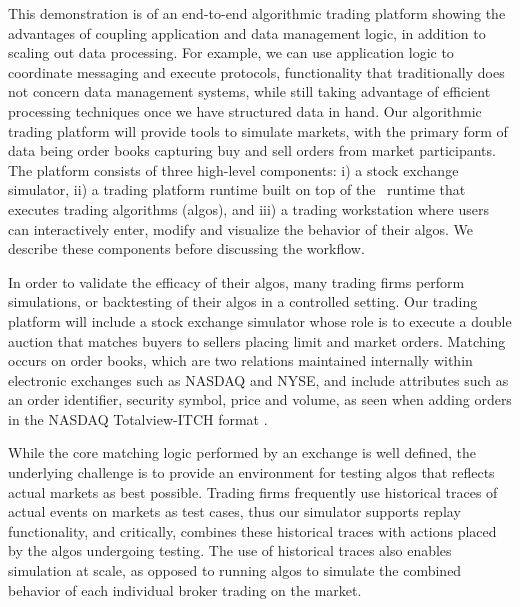 This demonstration is of an end-to-end algorithmic trading platform showing the
advantages of coupling application and data management logic, in addition to
scaling out data processing. For example, we can use application logic to
coordinate messaging and execute protocols, functionality that traditionally
does not concern data management systems, while still taking advantage of
efficient processing techniques once we have structured data in hand. Our
algorithmic trading platform will provide tools to simulate markets, with the
primary form of data being order books capturing buy and sell orders from market
participants. The platform consists of three high-level components: i) a stock
exchange simulator, ii) a trading platform runtime built on top of the
\compiler\ runtime that executes trading algorithms (algos), and iii) a trading
workstation where users can interactively enter, modify and visualize the
behavior of their algos. We describe these components before discussing the
workflow.

 In order to validate the efficacy of
their algos, many trading firms perform simulations, or backtesting of their
algos in a controlled setting. Our trading platform will include a stock
exchange simulator whose role is to execute a double auction that matches buyers
to sellers placing limit and market orders. Matching occurs on order books,
which are two relations maintained internally within electronic exchanges such
as NASDAQ and NYSE, and include attributes such as an order identifier, security
symbol, price and volume, as seen when adding orders in the NASDAQ
Totalview-ITCH format \todo{[NASDAQ]}.

While the core matching logic performed by an exchange is well defined, the
underlying challenge is to provide an environment for testing algos that
reflects actual markets as best possible. Trading firms frequently use
historical traces of actual events on markets as test cases, thus our simulator
supports replay functionality, and critically, combines these historical traces
with actions placed by the algos undergoing testing. The use of historical
traces also enables simulation at scale, as opposed to running algos to simulate
the combined behavior of each individual broker trading on the market.

